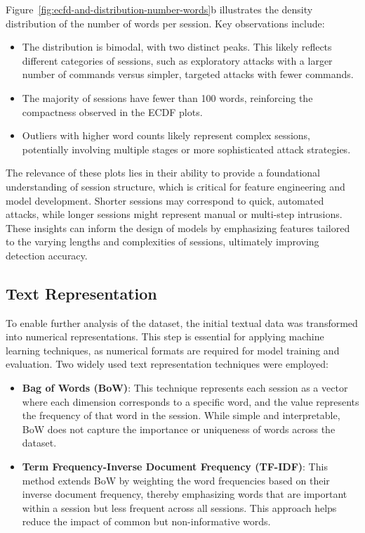         Figure~\ref{fig:ecfd-and-distribution-number-words}b illustrates the density distribution of the number of words per session. Key observations include:
        \begin{itemize}
            \item The distribution is bimodal, with two distinct peaks. This likely reflects different categories of sessions, such as exploratory attacks with a larger number of commands versus simpler, targeted attacks with fewer commands.
            \item The majority of sessions have fewer than 100 words, reinforcing the compactness observed in the ECDF plots.
            \item Outliers with higher word counts likely represent complex sessions, potentially involving multiple stages or more sophisticated attack strategies.
        \end{itemize}

        The relevance of these plots lies in their ability to provide a foundational understanding of session structure, which is critical for feature engineering and model development. Shorter sessions may correspond to quick, automated attacks, while longer sessions might represent manual or multi-step intrusions. These insights can inform the design of models by emphasizing features tailored to the varying lengths and complexities of sessions, ultimately improving detection accuracy.

    \subsection{Text Representation}

        To enable further analysis of the dataset, the initial textual data was transformed into numerical representations. This step is essential for applying machine learning techniques, as numerical formats are required for model training and evaluation. Two widely used text representation techniques were employed:

        \begin{itemize}
            \item \textbf{Bag of Words (BoW)}: This technique represents each session as a vector where each dimension corresponds to a specific word, and the value represents the frequency of that word in the session. While simple and interpretable, BoW does not capture the importance or uniqueness of words across the dataset.
            \item \textbf{Term Frequency-Inverse Document Frequency (TF-IDF)}: This method extends BoW by weighting the word frequencies based on their inverse document frequency, thereby emphasizing words that are important within a session but less frequent across all sessions. This approach helps reduce the impact of common but non-informative words.
        \end{itemize}


